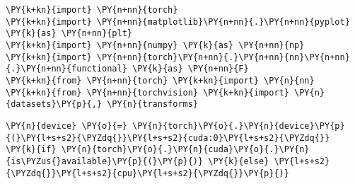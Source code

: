     \begin{tcolorbox}[breakable, size=fbox, boxrule=1pt, pad at break*=1mm,colback=cellbackground, colframe=cellborder]
\begin{Verbatim}[commandchars=\\\{\}]
\PY{k+kn}{import} \PY{n+nn}{torch}
\PY{k+kn}{import} \PY{n+nn}{matplotlib}\PY{n+nn}{.}\PY{n+nn}{pyplot} \PY{k}{as} \PY{n+nn}{plt}
\PY{k+kn}{import} \PY{n+nn}{numpy} \PY{k}{as} \PY{n+nn}{np}
\PY{k+kn}{import} \PY{n+nn}{torch}\PY{n+nn}{.}\PY{n+nn}{nn}\PY{n+nn}{.}\PY{n+nn}{functional} \PY{k}{as} \PY{n+nn}{F}
\PY{k+kn}{from} \PY{n+nn}{torch} \PY{k+kn}{import} \PY{n}{nn}
\PY{k+kn}{from} \PY{n+nn}{torchvision} \PY{k+kn}{import} \PY{n}{datasets}\PY{p}{,} \PY{n}{transforms}
\end{Verbatim}
\end{tcolorbox}

    \begin{tcolorbox}[breakable, size=fbox, boxrule=1pt, pad at break*=1mm,colback=cellbackground, colframe=cellborder]
\begin{Verbatim}[commandchars=\\\{\}]
\PY{n}{device} \PY{o}{=} \PY{n}{torch}\PY{o}{.}\PY{n}{device}\PY{p}{(}\PY{l+s+s2}{\PYZdq{}}\PY{l+s+s2}{cuda:0}\PY{l+s+s2}{\PYZdq{}} \PY{k}{if} \PY{n}{torch}\PY{o}{.}\PY{n}{cuda}\PY{o}{.}\PY{n}{is\PYZus{}available}\PY{p}{(}\PY{p}{)} \PY{k}{else} \PY{l+s+s2}{\PYZdq{}}\PY{l+s+s2}{cpu}\PY{l+s+s2}{\PYZdq{}}\PY{p}{)}
\end{Verbatim}
\end{tcolorbox}

